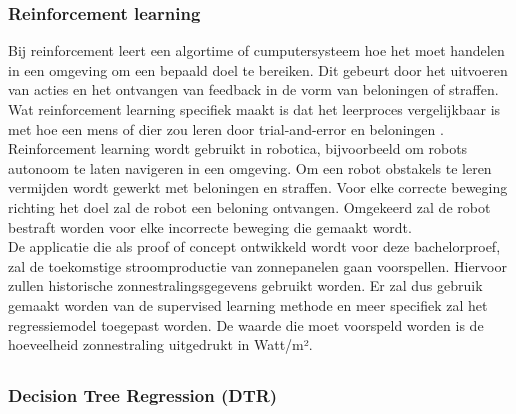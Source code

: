 \subsubsection{Reinforcement learning}

Bij reinforcement leert een algortime of cumputersysteem hoe het moet handelen in een omgeving om een bepaald doel te bereiken. Dit gebeurt door het uitvoeren van acties en het ontvangen van feedback in de vorm van beloningen of straffen. Wat reinforcement learning specifiek maakt is dat het leerproces vergelijkbaar is met hoe een mens of dier zou leren door trial-and-error en beloningen \autocite{Efimov2024}. \\

Reinforcement learning wordt gebruikt in robotica, bijvoorbeeld om robots autonoom te laten navigeren in een omgeving. Om een robot obstakels te leren vermijden wordt gewerkt met beloningen en straffen. Voor elke correcte beweging richting het doel zal de robot een beloning ontvangen. Omgekeerd zal de robot bestraft worden voor elke incorrecte beweging die gemaakt wordt. \\

De applicatie die als proof of concept ontwikkeld wordt voor deze bachelorproef, zal de toekomstige stroomproductie van zonnepanelen gaan voorspellen. Hiervoor zullen historische zonnestralingsgegevens gebruikt worden. Er zal dus gebruik gemaakt worden van de supervised learning methode en meer specifiek zal het regressiemodel toegepast worden. De waarde die moet voorspeld worden is de hoeveelheid zonnestraling uitgedrukt in Watt/m².

\subsection{}%
\label{sec:supervised machine learning: regressie modellen}

\subsubsection{Decision Tree Regression (DTR)}

